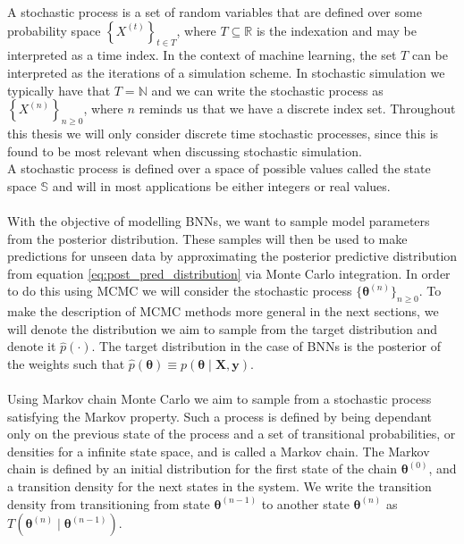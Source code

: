 A stochastic process is a set of random variables that are defined over some probability space $\left\{X^{(t)} \right\}_{t\in T}$, where $T\subseteq \mathbb{R}$ is the indexation and may be interpreted as a time index. In the context of machine learning, the set $T$ can be interpreted as the iterations of a simulation scheme. In stochastic simulation we typically have that $T=\mathbb{N}$ and we can write the stochastic process as $\left\{X^{(n)}\right\}_{n\geq 0}$, where $n$ reminds us that we have a discrete index set. Throughout this thesis we will only consider discrete time stochastic processes, since this is found to be most relevant when discussing stochastic simulation. \\
A stochastic process is defined over a space of possible values called the state space $\mathbb{S}$ and will in most applications be either integers or real values. 
\\
\\
With the objective of modelling BNNs, we want to sample model parameters from the posterior distribution. These samples will then be used to make predictions for unseen data by approximating the posterior predictive distribution from equation \ref{eq:post_pred_distribution} via Monte Carlo integration. In order to do this using MCMC we will consider the stochastic process $\{\boldsymbol{\theta}^{(n)}\}_{n\geq 0}$. To make the description of MCMC methods more general in the next sections, we will denote the distribution we aim to sample from the target distribution and denote it $\hat{p}(\cdot)$. The target distribution in the case of BNNs is the posterior of the weights such that $\hat{p}(\boldsymbol{\theta})\equiv p(\boldsymbol{\theta}\mid \boldsymbol{X},\boldsymbol{y})$.
\\
\\
Using Markov chain Monte Carlo we aim to sample from a stochastic process satisfying the Markov property. Such a process is defined by being dependant only on the previous state of the process and a set of transitional probabilities, or densities for a infinite state space, and is called a Markov chain. The Markov chain is defined by an initial distribution for the first state of the chain $\boldsymbol{\theta}^{(0)}$, and a transition density for the next states in the system. We write the transition density from transitioning from state $\boldsymbol{\theta}^{(n-1)}$ to another state $\boldsymbol{\theta}^{(n)}$ as $T(\boldsymbol{\theta}^{(n)}\mid \boldsymbol{\theta}^{(n-1)})$. \\
\\
